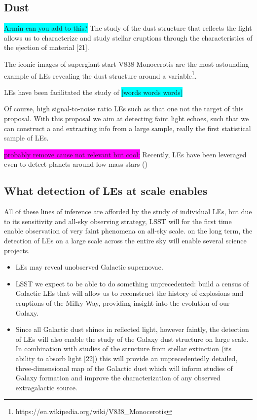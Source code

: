 \documentclass{proposalnsf}
\newcommand{\armin}[1]{\colorbox{cyan}{#1}}
\newcommand{\changeit}[1]{\colorbox{magenta}{#1}}
\begin{document}
\subsection{Dust}
\armin{Armin can you add to this?}
The study of the dust structure that reflects the light allows us to characterize and study stellar eruptions through the characteristics of the ejection of material [21].

The iconic images of supergiant start V838 Monocerotis are the most astounding example of LEs revealing the dust structure around a variable\footnote{https://en.wikipedia.org/wiki/V838_Monocerotis}. 

LEs have been facilitated the study of \armin{[words words words]}

Of course, high signal-to-noise ratio LEs such as that one not the target of this proposal. With this proposal we aim at detecting faint light echoes, such that we can construct a and extracting info from a large sample, really the first statistical sample of LEs. 


\changeit{probably remove cause not relevant but cool:} Recently, LEs have been leveraged even to detect planets around low mass stars (\citep{sparks2018})

\subsection{What detection of LEs at scale enables}
All of these lines of inference are afforded by the study of individual LEs, but due to its sensitivity and all-sky observing strategy, LSST will for the first time enable observation of very faint phenomena on all-sky scale.  on the long term, the detection of LEs on a large scale across the entire sky will enable several science projects.

\begin{itemize}
  \item 
LEs may reveal unobserved Galactic supernovae.  
 \item 
LSST we expect to be able to do something unprecedented: build a census of Galactic LEs that will allow us to reconstruct the history of explosions and eruptions of the Milky Way, providing insight into the evolution of our Galaxy.   
\item Since all Galactic dust shines in reflected light, however faintly, the detection of LEs will also enable the study of the Galaxy dust structure on large scale.   In combination with studies of the structure from stellar extinction (its ability to absorb light [22]) this will provide an unprecedentedly detailed, three-dimensional map of the Galactic dust which will inform studies of Galaxy formation and improve the characterization of any observed extragalactic source.  
\end{itemize}
\end{document}
